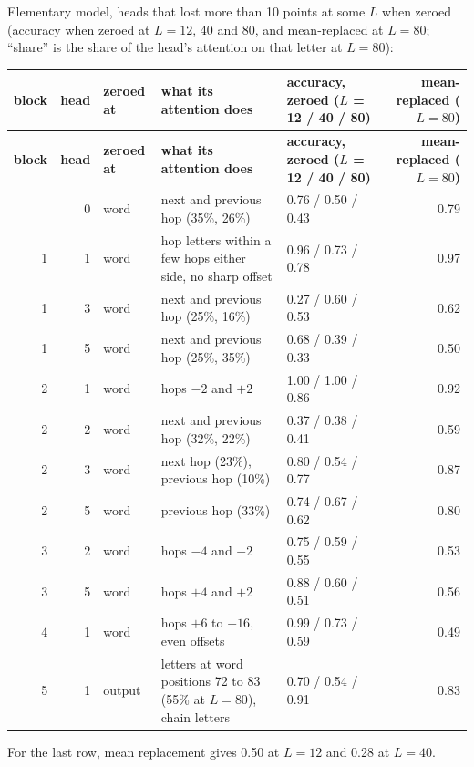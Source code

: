\documentclass[paper=a4,fontsize=11pt,DIV=11,parskip=half,headings=small,numbers=noendperiod]{scrartcl}
\DeclareRobustCommand{\hdr}[1]{\textsf{\bfseries #1}}
\begin{document}
Elementary model, heads that lost more than 10 points at some $L$ when zeroed (accuracy when zeroed at $L=12$,
40 and 80, and mean-replaced at $L=80$; “share” is the share of the head’s attention on that letter at $L=80$):

{\footnotesize\nopagebreak[4]
\begin{longtable}{@{}r r l >{\raggedright\arraybackslash}p{3.8cm} l r@{}}
\toprule
\hdr{block} & \hdr{head} & \hdr{zeroed at} & \hdr{what its attention does} & \hdr{accuracy, zeroed ($L$ = 12 / 40 / 80)} & \hdr{mean-replaced ($L=80$)} \\
\midrule
\endfirsthead
\toprule
\hdr{block} & \hdr{head} & \hdr{zeroed at} & \hdr{what its attention does} & \hdr{accuracy, zeroed ($L$ = 12 / 40 / 80)} & \hdr{mean-replaced ($L=80$)} \\
\midrule
\endhead
\bottomrule
\endlastfoot
1 & 0 & word & next and previous hop (35\%, 26\%) & 0.76 / 0.50 / 0.43 & 0.79 \\
1 & 1 & word & hop letters within a few hops either side, no sharp offset & 0.96 / 0.73 / 0.78 & 0.97 \\
1 & 3 & word & next and previous hop (25\%, 16\%) & 0.27 / 0.60 / 0.53 & 0.62 \\
1 & 5 & word & next and previous hop (25\%, 35\%) & 0.68 / 0.39 / 0.33 & 0.50 \\
2 & 1 & word & hops $-2$ and $+2$ & 1.00 / 1.00 / 0.86 & 0.92 \\
2 & 2 & word & next and previous hop (32\%, 22\%) & 0.37 / 0.38 / 0.41 & 0.59 \\
2 & 3 & word & next hop (23\%), previous hop (10\%) & 0.80 / 0.54 / 0.77 & 0.87 \\
2 & 5 & word & previous hop (33\%) & 0.74 / 0.67 / 0.62 & 0.80 \\
3 & 2 & word & hops $-4$ and $-2$ & 0.75 / 0.59 / 0.55 & 0.53 \\
3 & 5 & word & hops $+4$ and $+2$ & 0.88 / 0.60 / 0.51 & 0.56 \\
4 & 1 & word & hops $+6$ to $+16$, even offsets & 0.99 / 0.73 / 0.59 & 0.49 \\
5 & 1 & output & letters at word positions 72 to 83 (55\% at $L=80$), chain letters & 0.70 / 0.54 / 0.91 & 0.83 \\
\end{longtable}}

For the last row, mean replacement gives 0.50 at $L=12$ and 0.28 at $L=40$.
\end{document}
